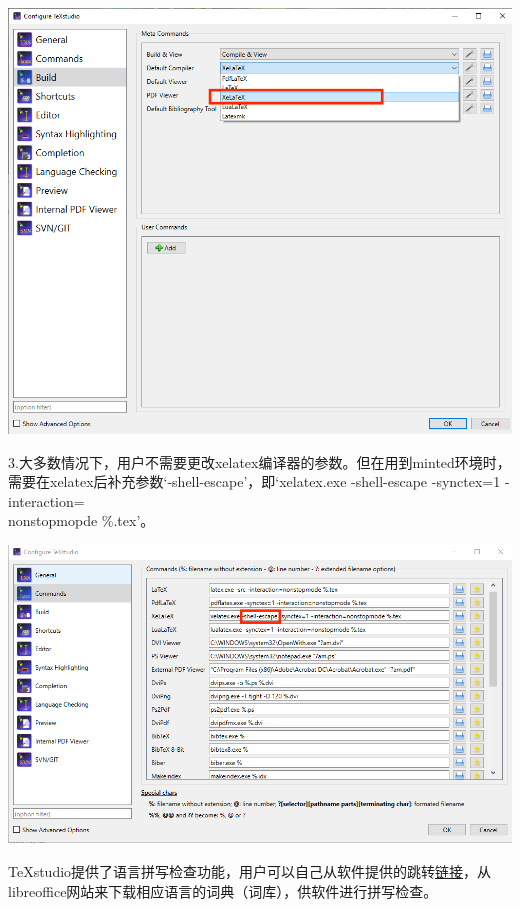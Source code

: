 \documentclass[12pt]{book}
\begin{document}
\begin{center}
     \includegraphics[scale=0.8]{./texstudio-build.png}
\end{center}
3.大多数情况下，用户不需要更改xelatex编译器的参数。但在用到minted环境时，需要在xelatex后补充参数`-shell-escape'，即`xelatex.exe -shell-escape -synctex=1 -interaction=\\nonstopmopde \%.tex'。


\begin{center}
     \includegraphics[scale=0.65]{./texstudio-command.png}
\end{center}
TeXstudio提供了语言拼写检查功能，用户可以自己从软件提供的跳转\href{https://extensions.libreoffice.org/}{链接}，从libreoffice网站来下载相应语言的词典（词库），供软件进行拼写检查。
\end{document}
